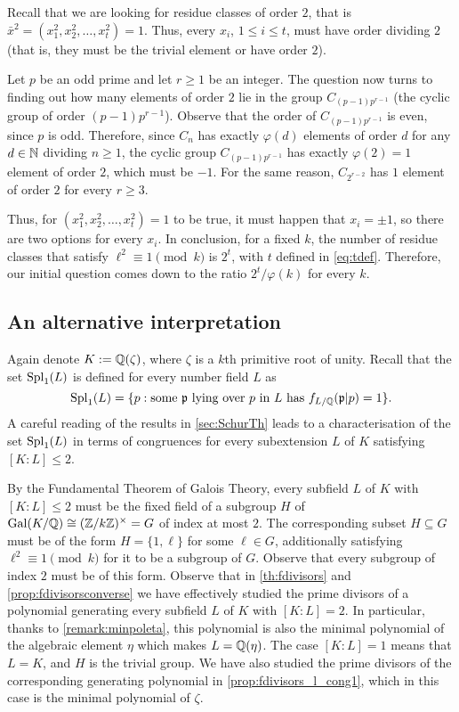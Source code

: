 \documentclass[../main.tex]{subfiles}
\begin{document}
Recall that we are looking for residue classes of order $2$, that is $\bar{x}^2=(x_1^2, x_2^2,\dots, x_t^2)=1$. Thus, every $x_i$, $1\leqslant i \leqslant t$, must have order dividing $2$ (that is, they must be the trivial element or have order $2$). 

Let $p$ be an odd prime and let $r\geqslant 1$ be an integer. The question now turns to finding out how many elements of order $2$ lie in the group $C_{(p-1)p^{r-1}}$ (the cyclic group of order $(p-1)p^{r-1}$). Observe that the order of $C_{(p-1)p^{r-1}}$ is even, since $p$ is odd. Therefore, since $C_n$ has exactly $\varphi(d)$ elements of order $d$ for any $d\in\mathbb{N}$ dividing $n\geqslant 1$, the cyclic group $C_{(p-1)p^{r-1}}$ has exactly $\varphi(2)=1$ element of order $2$, which must be $-1$. For the same reason, $C_{2^{r-2}}$ has $1$ element of order $2$ for every $r\geqslant 3$.

Thus, for $(x_1^2, x_2^2,\dots, x_t^2)=1$ to be true, it must happen that $x_i=\pm 1$, so there are two options for every $x_i$. In conclusion, for a fixed $k$, the number of residue classes that satisfy $\ell^2\equiv 1\pmod{k}$ is $2^t$, with $t$ defined in \cref{eq:tdef}. Therefore, our initial question comes down to the ratio $2^t/\varphi(k)$ for every $k$.

\subsection{An alternative interpretation}\label{sec:interprreciprocity}

 Again denote $K:=\mathbb{Q}(\zeta)$, where $\zeta$ is a $k$th primitive root of unity. Recall that the set $\operatorname{Spl}_1(L)$ is defined for every number field $L$ as
\begin{equation*}
	\operatorname{Spl}_1(L)=\{p: \text{some $\mathfrak{p}$ lying over $p$ in $L$ has $f_{L/\mathbb{Q}}(\mathfrak{p}|p)=1$}\}.
\end{equation*}
A careful reading of the results in \cref{sec:SchurTh} leads to a characterisation of the set $\operatorname{Spl}_1(L)$ in terms of congruences for every subextension $L$ of $K$ satisfying $[K:L]\leqslant 2$.

By the Fundamental Theorem of Galois Theory, every subfield $L$ of $K$ with $[K:L]\leqslant 2$ must be the fixed field of a subgroup $H$ of $\operatorname{Gal}(K/\mathbb{Q})\cong (\mathbb{Z}/k\mathbb{Z})^\times=G$ of index at most $2$. The corresponding subset $H\subseteq G$ must be of the form $H=\{1, \ell\}$ for some $\ell\in G$, additionally satisfying $\ell^2\equiv 1\pmod{k}$ for it to be a subgroup of $G$. Observe that every subgroup of index $2$ must be of this form. Observe that in \cref{th:fdivisors} and \cref{prop:fdivisorsconverse} we have effectively studied the prime divisors of a polynomial generating every subfield $L$ of $K$ with $[K:L]=2$. In particular, thanks to \cref{remark:minpoleta}, this polynomial is also the minimal polynomial of the algebraic element $\eta$ which makes $L=\mathbb{Q}(\eta)$. The case $[K:L]=1$ means that $L=K$, and $H$ is the trivial group. We have also studied the prime divisors of the corresponding generating polynomial in \cref{prop:fdivisors_l_cong1}, which in this case is the minimal polynomial of $\zeta$.
\end{document}
